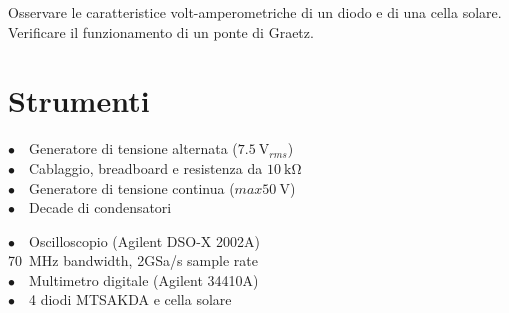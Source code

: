 Osservare le caratteristice volt-amperometriche di un diodo e di una cella solare. Verificare il funzionamento di un ponte di Graetz.

\section{Strumenti}
%
\phantom{porcodio!}
\noindent
\begin{minipage}{.5\linewidth}
$\bullet \quad$Generatore di tensione alternata ($\SI{7.5}{\volt}_{rms}$)\\
$\bullet \quad$Cablaggio, breadboard e resistenza da $\SI{10}{\kilo\ohm}$\\
$\bullet \quad$Generatore di tensione continua ($max \SI{50}{\volt}$)\\
$\bullet \quad$Decade di condensatori
\end{minipage}%
\begin{minipage}{.5\linewidth}
$\bullet \quad$Oscilloscopio (Agilent DSO-X 2002A)\\
\phantom{xxxx}\SI{70}{\mega\hertz} bandwidth, 2GSa/s sample rate\\
$\bullet \quad$Multimetro digitale (Agilent 34410A)\\
$\bullet \quad$4 diodi MTSAKDA e cella solare
\end{minipage}